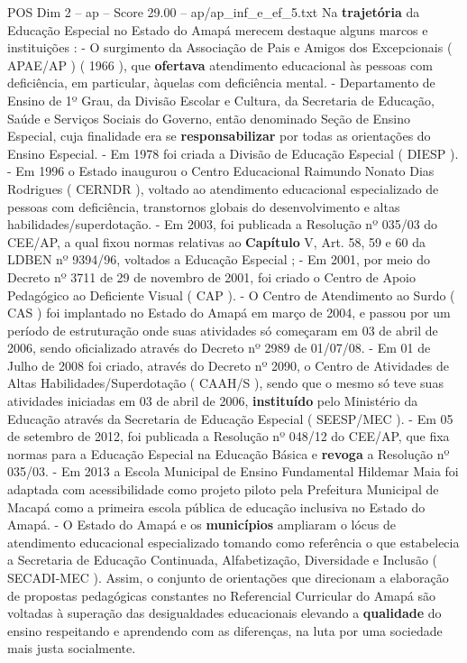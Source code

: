 \begin{textsample}{POS Dim 2 – ap – Score 29.00 – ap/ap\_inf\_e\_ef\_5.txt}
Na \textbf{trajetória} da Educação Especial no Estado do Amapá merecem destaque alguns marcos e instituições : - O surgimento da Associação de Pais e Amigos dos Excepcionais ( APAE/AP ) ( 1966 ), que \textbf{ofertava} atendimento educacional às pessoas com deficiência, em particular, àquelas com deficiência mental. - Departamento de Ensino de 1º Grau, da Divisão Escolar e Cultura, da Secretaria de Educação, Saúde e Serviços Sociais do Governo, então denominado Seção de Ensino Especial, cuja finalidade era se \textbf{responsabilizar} por todas as orientações do Ensino Especial. - Em 1978 foi criada a Divisão de Educação Especial ( DIESP ). - Em 1996 o Estado inaugurou o Centro Educacional Raimundo Nonato Dias Rodrigues ( CERNDR ), voltado ao atendimento educacional especializado de pessoas com deficiência, transtornos globais do desenvolvimento e altas habilidades/superdotação. - Em 2003, foi publicada a Resolução nº 035/03 do CEE/AP, a qual fixou normas relativas ao \textbf{Capítulo} V, Art. 58, 59 e 60 da LDBEN nº 9394/96, voltados a Educação Especial ; - Em 2001, por meio do Decreto nº 3711 de 29 de novembro de 2001, foi criado o Centro de Apoio Pedagógico ao Deficiente Visual ( CAP ). - O Centro de Atendimento ao Surdo ( CAS ) foi implantado no Estado do Amapá em março de 2004, e passou por um período de estruturação onde suas atividades só começaram em 03 de abril de 2006, sendo oficializado através do Decreto nº 2989 de 01/07/08. - Em 01 de Julho de 2008 foi criado, através do Decreto nº 2090, o Centro de Atividades de Altas Habilidades/Superdotação ( CAAH/S ), sendo que o mesmo só teve suas atividades iniciadas em 03 de abril de 2006, \textbf{instituído} pelo Ministério da Educação através da Secretaria de Educação Especial ( SEESP/MEC ). - Em 05 de setembro de 2012, foi publicada a Resolução nº 048/12 do CEE/AP, que fixa normas para a Educação Especial na Educação Básica e \textbf{revoga} a Resolução nº 035/03. - Em 2013 a Escola Municipal de Ensino Fundamental Hildemar Maia foi adaptada com acessibilidade como projeto piloto pela Prefeitura Municipal de Macapá como a primeira escola pública de educação inclusiva no Estado do Amapá. - O Estado do Amapá e os \textbf{municípios} ampliaram o lócus de atendimento educacional especializado tomando como referência o que estabelecia a Secretaria de Educação Continuada, Alfabetização, Diversidade e Inclusão ( SECADI-MEC ).
Assim, o conjunto de orientações que direcionam a elaboração de propostas pedagógicas constantes no Referencial Curricular do Amapá são voltadas à superação das desigualdades educacionais elevando a \textbf{qualidade} do ensino respeitando e aprendendo com as diferenças, na luta por uma sociedade mais justa socialmente.

\end{textsample}
